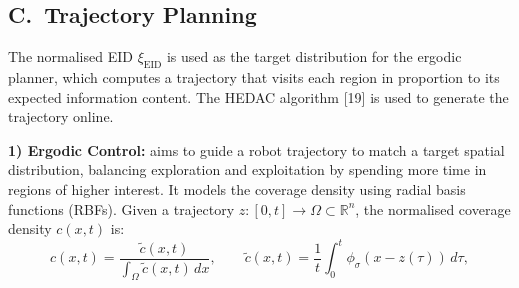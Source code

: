 \documentclass[11pt]{article}
\begin{document}
\subsection*{C.\ Trajectory Planning}

The normalised EID $\xi_{\mathrm{EID}}$ is used as the target
distribution for the ergodic planner, which computes a trajectory
that visits each region in proportion to its expected information
content. The HEDAC algorithm [19] is used to generate the trajectory
online.

\textbf{1) Ergodic Control:} aims to guide a robot trajectory to
match a target spatial distribution, balancing exploration and
exploitation by spending more time in regions of higher interest. It
models the coverage density using radial basis functions (RBFs).
Given a trajectory
$z: [0, t] \to \Omega \subset \mathbb{R}^{n}$,
the normalised coverage density $c(x, t)$ is:
\[
c(x, t) = \frac{\tilde{c}(x, t)}{\int_{\Omega} \tilde{c}(x, t)\,dx},
\qquad
\tilde{c}(x, t) = \frac{1}{t}\int_{0}^{t}
\phi_{\sigma}(x - z(\tau))\,d\tau,
\]
\end{document}
